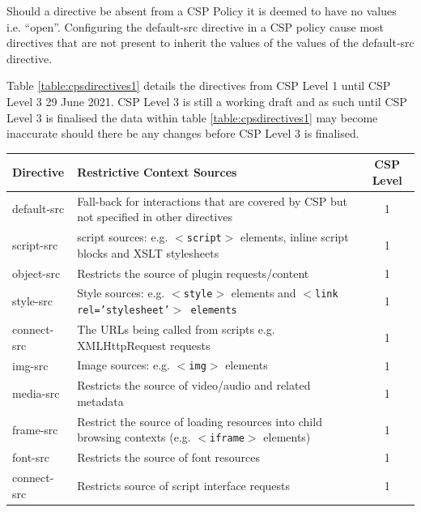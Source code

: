 \documentclass{mscreport}
\begin{document}
\vspace{0.3cm} \noindent
Should a directive be absent from a CSP Policy it is deemed to have no values i.e. ``open''. Configuring the default-src directive in a CSP policy cause most directives that are not present to inherit the values of the values of the default-src directive.

\vspace{0.3cm} \noindent
Table \ref{table:cpsdirectives1} details the directives from CSP Level 1 until CSP Level 3 29 June 2021. CSP Level 3 is still a working draft and as such until CSP Level 3 is finalised the data within table \ref{table:cpsdirectives1} may become inaccurate should there be any changes before CSP Level 3 is finalised.

\begin{table}[h!]
  \begin{center}
    \begin{tabular}{|l|J|c|}  %
      \hline
      \textbf{Directive} & \textbf{Restrictive Context Sources} & \textbf{CSP Level}\\
      \hline
      default-src & Fall-back for interactions that are covered by CSP but not specified in other directives & 1\\
      \hline
      script-src & script sources: e.g. \texttt{$<$script$>$} elements, inline script blocks and XSLT stylesheets & 1 \\
      \hline
      object-src & Restricts the source of plugin requests/content & 1 \\
      \hline
      style-src & Style sources: e.g. \texttt{$<$style$>$} elements and \texttt{$<$link rel='stylesheet'$>$ elements} & 1\\
      \hline
      connect-src & The URLs being called from scripts e.g. XMLHttpRequest requests & 1 \\
      \hline
      img-src & Image sources: e.g. \texttt{$<$img$>$} elements & 1\\
      \hline
      media-src & Restricts the source of video/audio and related metadata & 1\\
      \hline
      frame-src & Restrict the source of loading resources into child browsing contexts (e.g. \texttt{$<$iframe$>$} elements) & 1\\
      \hline
      font-src & Restricts the source of font resources & 1\\
      \hline
      connect-src & Restricts source of script interface requests & 1\\

\end{tabular}
\end{center}
\end{table}
\end{document}
